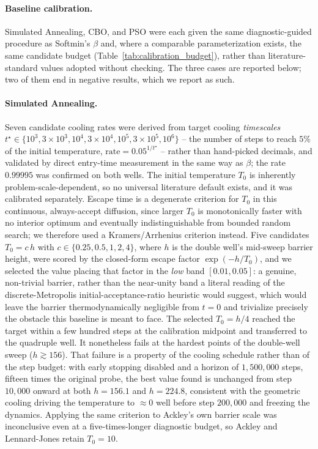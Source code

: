 \documentclass{article}
\theoremstyle{plain}
\theoremstyle{definition}
\theoremstyle{remark}
\begin{document}
\paragraph{Baseline calibration.} Simulated Annealing, CBO, and PSO were each given the same diagnostic-guided procedure as Softmin's $\beta$ and, where a comparable parameterization exists, the same candidate budget (Table~\ref{tab:calibration_budget}), rather than literature-standard values adopted without checking. The three cases are reported below; two of them end in negative results, which we report as such.

\paragraph{Simulated Annealing.} Seven candidate cooling rates were derived from target cooling \emph{timescales} $t^\star\in\{10^3,3{\times}10^3,10^4,3{\times}10^4,10^5,3{\times}10^5,10^6\}$ -- the number of steps to reach $5\%$ of the initial temperature, $\text{rate}=0.05^{1/t^\star}$ -- rather than hand-picked decimals, and validated by direct entry-time measurement in the same way as $\beta$; the rate $0.99995$ was confirmed on both wells. The initial temperature $T_0$ is inherently problem-scale-dependent, so no universal literature default exists, and it was calibrated separately. Escape time is a degenerate criterion for $T_0$ in this continuous, always-accept diffusion, since larger $T_0$ is monotonically faster with no interior optimum and eventually indistinguishable from bounded random search; we therefore used a Kramers/Arrhenius criterion instead. Five candidates $T_0=c\,h$ with $c\in\{0.25,0.5,1,2,4\}$, where $h$ is the double well's mid-sweep barrier height, were scored by the closed-form escape factor $\exp(-h/T_0)$, and we selected the value placing that factor in the \emph{low} band $[0.01,0.05]$: a genuine, non-trivial barrier, rather than the near-unity band a literal reading of the discrete-Metropolis initial-acceptance-ratio heuristic \cite{kirkpatrick1983optimization} would suggest, which would leave the barrier thermodynamically negligible from $t=0$ and trivialize precisely the obstacle this baseline is meant to face. The selected $T_0=h/4$ reached the target within a few hundred steps at the calibration midpoint and transferred to the quadruple well. It nonetheless fails at the hardest points of the double-well sweep ($h\gtrsim156$). That failure is a property of the cooling schedule rather than of the step budget: with early stopping disabled and a horizon of $1{,}500{,}000$ steps, fifteen times the original probe, the best value found is unchanged from step $10{,}000$ onward at both $h=156.1$ and $h=224.8$, consistent with the geometric cooling driving the temperature to $\approx0$ well before step $200{,}000$ and freezing the dynamics. Applying the same criterion to Ackley's own barrier scale was inconclusive even at a five-times-longer diagnostic budget, so Ackley and Lennard-Jones retain $T_0=10$.
\end{document}
